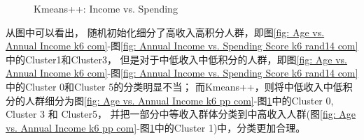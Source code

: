 \documentclass[8pt]{article}
\begin{document}
\begin{figure}[H]
\begin{minipage}{0.32\textwidth}
        \caption{Kmeans++: Income vs. Spending}
        \label{fig: Annual Income vs. Spending Score k6 rand14 pp com}
    \end{minipage}
    \hfill
\end{figure}

从图中可以看出，
随机初始化细分了高收入高积分人群，即图\ref{fig: Age vs. Annual Income k6 com}-图\ref{fig: Annual Income vs. Spending Score k6 rand14 com}中的Cluster1和Cluster3，
但是对于中低收入中低积分的人群，即图\ref{fig: Age vs. Annual Income k6 com}-图\ref{fig: Annual Income vs. Spending Score k6 rand14 com}中的Cluster 0和Cluster 5的分类明显不当；
而Kmeans++，则将中低收入中低积分的人群细分为图\ref{fig: Age vs. Annual Income k6 pp com}-图\ref{fig: Annual Income vs. Spending Score k6 rand14 pp com}中的Cluster 0, Cluster 3 和 Cluster5，
并把一部分中等收入群体分类到中高收入人群(图\ref{fig: Age vs. Annual Income k6 pp com}-图\ref{fig: Annual Income vs. Spending Score k6 rand14 pp com}中的Cluster 1)中，分类更加合理。
\end{document}
